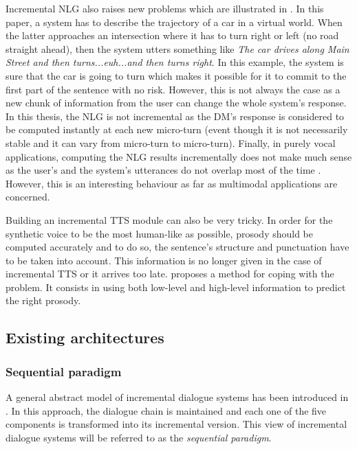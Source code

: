 Incremental NLG also raises new problems which are illustrated in \cite{Baumann2013}. In this paper, a system has to describe the trajectory of a car in a virtual world. When the latter approaches an intersection where it has to turn right or left (no road straight ahead), then the system utters something like \textit{The car drives along Main Street and then turns...euh...and then turns right}. In this example, the system is sure that the car is going to turn which makes it possible for it to commit to the first part of the sentence with no risk. However, this is not always the case as a new chunk of information from the user can change the whole system's response. In this thesis, the NLG is not incremental as the DM's response is considered to be computed instantly at each new micro-turn (event though it is not necessarily stable and it can vary from micro-turn to micro-turn). Finally, in purely vocal applications, computing the NLG results incrementally does not make much sense as the user's and the system's utterances do not overlap most of the time \cite{Sacks1974}. However, this is an interesting behaviour as far as multimodal applications are concerned.

Building an incremental TTS module can also be very tricky. In order for the synthetic voice to be the most human-like as possible, prosody should be computed accurately and to do so, the sentence's structure and punctuation have to be taken into account. This information is no longer given in the case of incremental TTS or it arrives too late. \citet{Baumann2014} proposes a method for coping with the problem. It consists in using both low-level and high-level information to predict the right prosody.


\subsection{Existing architectures}
\subsubsection{Sequential paradigm}

A general abstract model of incremental dialogue systems has been introduced in\\\cite{Schlangen2011}. In this approach, the dialogue chain is maintained and each one of the five components is transformed into its incremental version. This view of incremental dialogue systems will be referred to as the \textit{sequential paradigm}.

